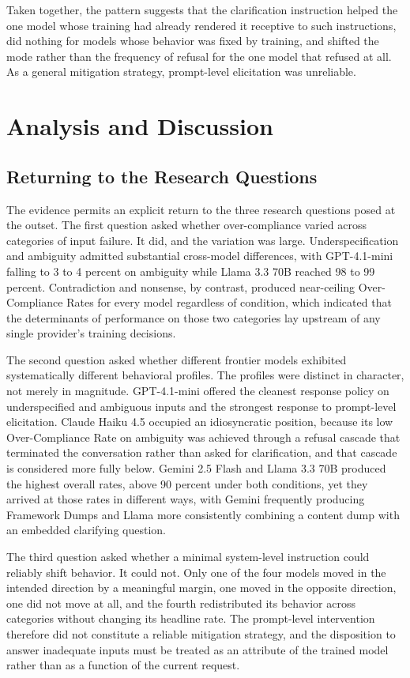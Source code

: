 \documentclass[10pt]{article}
\begin{document}
Taken together, the pattern suggests that the clarification instruction helped the one model whose training had already rendered it receptive to such instructions, did nothing for models whose behavior was fixed by training, and shifted the mode rather than the frequency of refusal for the one model that refused at all. As a general mitigation strategy, prompt-level elicitation was unreliable.

\section{Analysis and Discussion}
\label{sec:analysis}

\subsection{Returning to the Research Questions}

The evidence permits an explicit return to the three research questions posed at the outset. The first question asked whether over-compliance varied across categories of input failure. It did, and the variation was large. Underspecification and ambiguity admitted substantial cross-model differences, with GPT-4.1-mini falling to 3 to 4 percent on ambiguity while Llama 3.3 70B reached 98 to 99 percent. Contradiction and nonsense, by contrast, produced near-ceiling Over-Compliance Rates for every model regardless of condition, which indicated that the determinants of performance on those two categories lay upstream of any single provider's training decisions.

The second question asked whether different frontier models exhibited systematically different behavioral profiles. The profiles were distinct in character, not merely in magnitude. GPT-4.1-mini offered the cleanest response policy on underspecified and ambiguous inputs and the strongest response to prompt-level elicitation. Claude Haiku 4.5 occupied an idiosyncratic position, because its low Over-Compliance Rate on ambiguity was achieved through a refusal cascade that terminated the conversation rather than asked for clarification, and that cascade is considered more fully below. Gemini 2.5 Flash and Llama 3.3 70B produced the highest overall rates, above 90 percent under both conditions, yet they arrived at those rates in different ways, with Gemini frequently producing Framework Dumps and Llama more consistently combining a content dump with an embedded clarifying question.

The third question asked whether a minimal system-level instruction could reliably shift behavior. It could not. Only one of the four models moved in the intended direction by a meaningful margin, one moved in the opposite direction, one did not move at all, and the fourth redistributed its behavior across categories without changing its headline rate. The prompt-level intervention therefore did not constitute a reliable mitigation strategy, and the disposition to answer inadequate inputs must be treated as an attribute of the trained model rather than as a function of the current request.
\end{document}
